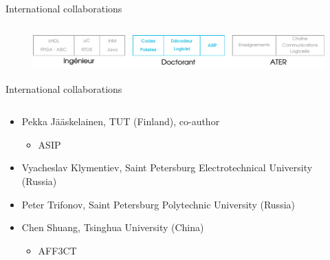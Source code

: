 \documentclass[t,compress,mathserif,12pt,xcolor=dvipsnames]{beamer}
\begin{document}
\begin{frame}[t]{International collaborations}
\begin{minipage}[t][5.0cm][t]{\textwidth}
\begin{columns}[T]
\begin{column}{0.33\textwidth}
      \end{column}
    \end{columns}
  \end{minipage}
  \begin{figure}[htp]
    \centering
    \includegraphics[width=\textwidth]{fig/frise23}
  \end{figure}
\end{frame}


\begin{frame}[t]{International collaborations}
  \begin{minipage}[t][5.0cm][t]{\textwidth}
      \vspace{-0.3cm}
    \begin{columns}[T]
      \begin{column}{0.63\textwidth}
        \small{
          \begin{itemize}
            \item<+-> Pekka Jääskelainen, TUT (Finland), co-author
            \begin{itemize}
              \item<+->[$\rightarrow$] ASIP
            \end{itemize}
            \item<+-> Vyacheslav Klymentiev, Saint Petersburg Electrotechnical University (Russia)
            \item<3-> Peter Trifonov, Saint Petersburg Polytechnic University (Russia)
            \item<3-> Chen Shuang, Tsinghua University (China)
            \begin{itemize}
              \item<+->[$\rightarrow$] AFF3CT
            \end{itemize}
          \end{itemize}
        }
      \end{column}
      \begin{column}{0.04\textwidth}
      \end{column}
      \begin{column}{0.33\textwidth}
      \centering

\end{column}
\end{columns}
\end{minipage}
\end{frame}
\end{document}
